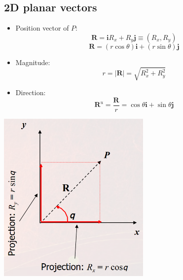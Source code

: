 \documentclass[11pt]{article}
\begin{document}
\subsection{2D planar vectors}
\label{sec:org2a012a1}
\begin{itemize}
\item Position vector of \(P\):
\[\boldsymbol{R} = \boldsymbol{i} R_x + R_y \boldsymbol{j} \equiv (R_x, R_y)\]
\[\boldsymbol{R} = (r \cos \theta) \boldsymbol{i} + (r \sin \theta) \boldsymbol{j}\]
\item Magnitude:
\[r = |\boldsymbol{R}| = \sqrt{R_x^2 + R_y^2}\]
\item Direction:
\[\boldsymbol{R}^u = \frac{\boldsymbol{R}}{r} = \cos \theta \boldsymbol{i} + \sin \theta \boldsymbol{j}\]
\end{itemize}

\begin{center}
\includegraphics[width=.9\linewidth]{./images/2d-planar-vectors.png}
\end{center}
\end{document}
